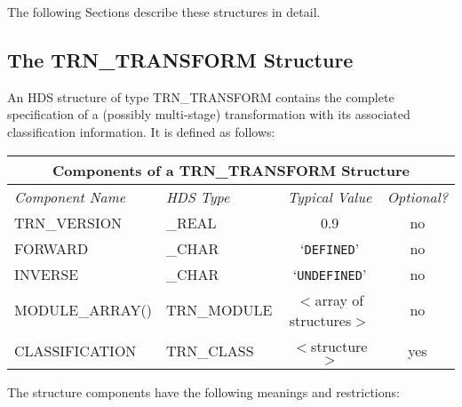 \documentclass[twoside,nolof,11pt]{starlink}
\providecommand{\name}[1]{\small{#1}}
\begin{document}
The following Sections describe these structures in detail.

\subsection{The \name{TRN\_TRANSFORM} Structure}

An \name{HDS} structure of type \name{TRN\_TRANSFORM} contains the complete
specification of a (possibly multi-stage) transformation with its associated
classification information.
It is defined as follows:

\begin{center}

\begin{tabular}{|llc|c|}
\hline
\multicolumn{4}{|c|}{\textbf{Components of a \name{TRN\_TRANSFORM} Structure}} \\
\hline
\hline
\emph{Component Name} & \emph{\name{HDS} Type} & \emph{Typical Value} & \emph{Optional?} \\
\hline
TRN\_VERSION & \_REAL & 0.9 & no \\
FORWARD & \_CHAR & `\verb#DEFINED#' & no \\
INVERSE & \_CHAR & `\verb#UNDEFINED#' & no \\
MODULE\_ARRAY() & TRN\_MODULE & $<$array of structures$>$ & no \\
CLASSIFICATION & TRN\_CLASS & $<$structure$>$ & yes \\
\hline
\end{tabular}

\end{center}

The structure components have the following meanings and restrictions:
\end{document}
